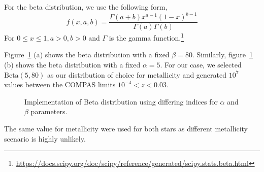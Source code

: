 For the beta distribution, we use the following form,
\begin{equation}
    f(x, a, b) = \frac{\Gamma(a+b)x^{a-1}(1-x)^{b-1}}{\Gamma(a)\Gamma(b)}
    \label{eq:beta_distribution}
\end{equation}
For $0 \leq x \leq 1, a > 0, b > 0$ and $\Gamma$ is the gamma function.\footnote{\url{https://docs.scipy.org/doc/scipy/reference/generated/scipy.stats.beta.html}}

Figure~\ref{fig:beta} (a) shows the beta distribution with a fixed $\beta=80$.
Similarly, figure~\ref{fig:beta} (b) shows the beta distribution with a fixed $\alpha=5$.
For our case, we selected $\text{Beta}(5, 80)$ as our distribution of choice for metallicity and generated $10^7$ values between the COMPAS limits $10^{-4} < z < 0.03$.

\begin{figure}[h]
	\centering
	\caption{Implementation of Beta distribution using differing indices for $\alpha$ and $\beta$ parameters.}
	\label{fig:beta}
\end{figure}

The same value for metallicity were used for both stars as different metallicity scenario is highly unlikely.
